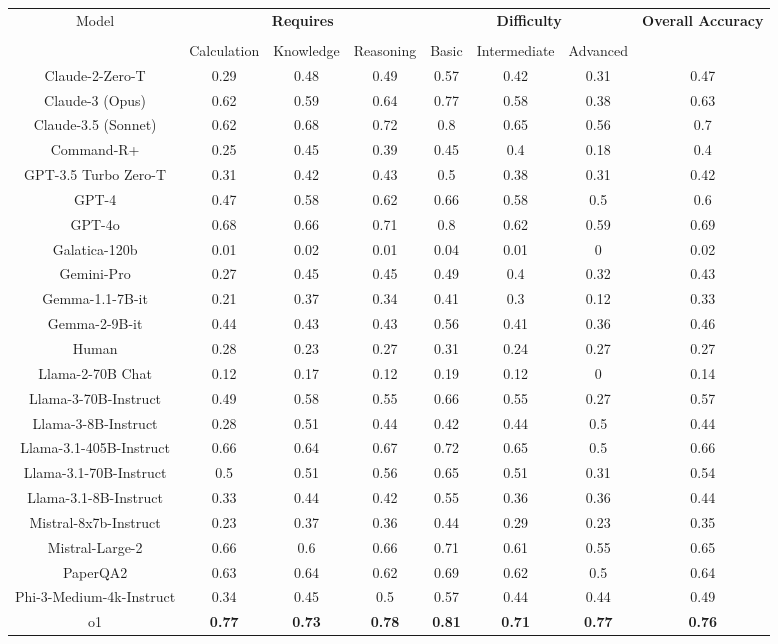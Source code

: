 \begin{tabular}{cccccccc}
\toprule
\multirow{3}{*}{Model} & \multicolumn{3}{c}{\textbf{Requires}} & \multicolumn{3}{c}{\textbf{Difficulty}} & \multirow{3}{*}{\textbf{Overall Accuracy}}\\\cmidrule(lr){2-4} \cmidrule(lr){5-7}\\
 & Calculation & Knowledge & Reasoning & Basic & Intermediate & Advanced &  \\
\midrule
Claude-2-Zero-T & 0.29 & 0.48 & 0.49 & 0.57 & 0.42 & 0.31 & 0.47 \\
Claude-3 (Opus) & 0.62 & 0.59 & 0.64 & 0.77 & 0.58 & 0.38 & 0.63 \\
Claude-3.5 (Sonnet) & 0.62 & 0.68 & 0.72 & 0.8 & 0.65 & 0.56 & 0.7 \\
Command-R+ & 0.25 & 0.45 & 0.39 & 0.45 & 0.4 & 0.18 & 0.4 \\
GPT-3.5 Turbo Zero-T & 0.31 & 0.42 & 0.43 & 0.5 & 0.38 & 0.31 & 0.42 \\
GPT-4 & 0.47 & 0.58 & 0.62 & 0.66 & 0.58 & 0.5 & 0.6 \\
GPT-4o & 0.68 & 0.66 & 0.71 & 0.8 & 0.62 & 0.59 & 0.69 \\
Galatica-120b & 0.01 & 0.02 & 0.01 & 0.04 & 0.01 & 0 & 0.02 \\
Gemini-Pro & 0.27 & 0.45 & 0.45 & 0.49 & 0.4 & 0.32 & 0.43 \\
Gemma-1.1-7B-it & 0.21 & 0.37 & 0.34 & 0.41 & 0.3 & 0.12 & 0.33 \\
Gemma-2-9B-it & 0.44 & 0.43 & 0.43 & 0.56 & 0.41 & 0.36 & 0.46 \\
Human & 0.28 & 0.23 & 0.27 & 0.31 & 0.24 & 0.27 & 0.27 \\
Llama-2-70B Chat & 0.12 & 0.17 & 0.12 & 0.19 & 0.12 & 0 & 0.14 \\
Llama-3-70B-Instruct & 0.49 & 0.58 & 0.55 & 0.66 & 0.55 & 0.27 & 0.57 \\
Llama-3-8B-Instruct & 0.28 & 0.51 & 0.44 & 0.42 & 0.44 & 0.5 & 0.44 \\
Llama-3.1-405B-Instruct & 0.66 & 0.64 & 0.67 & 0.72 & 0.65 & 0.5 & 0.66 \\
Llama-3.1-70B-Instruct & 0.5 & 0.51 & 0.56 & 0.65 & 0.51 & 0.31 & 0.54 \\
Llama-3.1-8B-Instruct & 0.33 & 0.44 & 0.42 & 0.55 & 0.36 & 0.36 & 0.44 \\
Mistral-8x7b-Instruct & 0.23 & 0.37 & 0.36 & 0.44 & 0.29 & 0.23 & 0.35 \\
Mistral-Large-2 & 0.66 & 0.6 & 0.66 & 0.71 & 0.61 & 0.55 & 0.65 \\
PaperQA2 & 0.63 & 0.64 & 0.62 & 0.69 & 0.62 & 0.5 & 0.64 \\
Phi-3-Medium-4k-Instruct & 0.34 & 0.45 & 0.5 & 0.57 & 0.44 & 0.44 & 0.49 \\
o1 & \textbf{0.77} & \textbf{0.73} & \textbf{0.78} & \textbf{0.81} & \textbf{0.71} & \textbf{0.77} & \textbf{0.76} \\
\bottomrule
\end{tabular}
